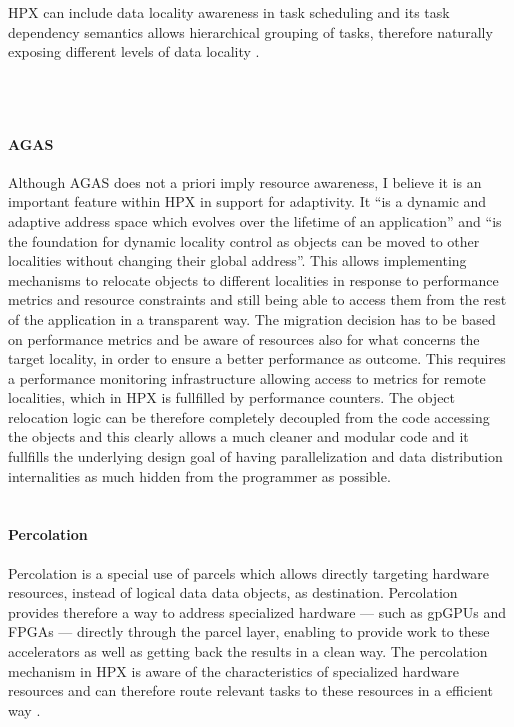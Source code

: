 HPX can include data locality awareness in task scheduling and its task dependency semantics allows hierarchical grouping of tasks, therefore naturally exposing different levels of data locality \cite{amatya2014parallel}.

~\\~

\paragraph{AGAS}
Although AGAS does not a priori imply resource awareness, I believe it is an important feature within HPX in support for adaptivity. It ``is a dynamic and adaptive address space
which evolves over the lifetime of an application'' and ``is the foundation for dynamic locality control as objects can be moved to other localities without changing their global address''.\cite{kaiser2014hpx}
This allows implementing mechanisms to relocate objects to different localities in response to performance metrics and resource constraints \cite{amatya2014parallel} and still being able to access them from the rest of the application in a transparent way. The migration decision has to be based on performance metrics and be aware of resources also for what concerns the target locality, in order to ensure a better performance as outcome. This requires a performance monitoring infrastructure allowing access to metrics for remote localities, which in HPX is fullfilled by performance counters.
The object relocation logic can be therefore completely decoupled from the code accessing the objects and this clearly allows a much cleaner and modular code and it fullfills the underlying design goal of having parallelization and data distribution internalities as much hidden from the programmer as possible.
~\\~

\paragraph{Percolation}
Percolation is a special use of parcels which allows directly targeting hardware resources, instead of logical data data objects, as destination.
Percolation provides therefore a way to address specialized hardware --- such as gpGPUs and FPGAs --- directly through the parcel layer, enabling to provide work to these accelerators as well as getting back the results in a clean way.
The percolation mechanism in HPX is aware of the characteristics of specialized hardware resources and can therefore route relevant tasks to these resources in a efficient way \cite{amatya2014parallel}.
~\\~

